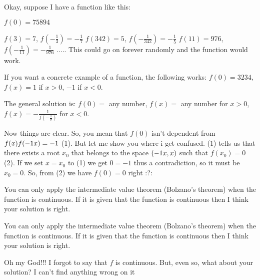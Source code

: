 \begin{solution}
	\begin{tcolorbox}Okay, suppose I have a function like this:

$ f(0) = 75894$

$ f(3) = 7$, $ f( - \frac {1}{3}) = - \frac {1}{7}$
$ f(342) = 5$, $ f( - \frac {1}{342}) = - \frac {1}{5}$
$ f(11) = 976$, $ f( - \frac {1}{11}) = - \frac {1}{976}$
.....
This could go on forever randomly and the function would work.

If you want a concrete example of a function, the following works:
$ f(0) = 3234$, $ f(x) = 1$ if $ x > 0$, $ - 1$ if $ x < 0$.

The general solution is:
$ f(0) =$ any number, $ f(x) =$ any number for $ x > 0$, $ f(x) = - \frac {1}{f( - \frac {1}{x})}$ for $ x < 0$.\end{tcolorbox}


Now things are clear. So, you mean that $ f(0)$ isn't dependent from $ f(x)f(-1\/x)=-1$ (1).
But let me show you where i get confused.
(1) tells us that there exists a root $ x_0$ that belongs to the space $ (-1\/x,x)$ such that $ f(x_0)=0$ (2).
If we set $ x=x_0$ to (1) we get $ 0=-1$ thus a contradiction, so it must be $ x_0=0$. So, from (2) we have $ f(0)=0$ right :?:
\end{solution}



\begin{solution}
	You can only apply the intermediate value theorem (Bolzano's theorem) when the function is continuous. If it is given that the function is continuous then I think your solution is right.
\end{solution}



\begin{solution}
	\begin{tcolorbox}You can only apply the intermediate value theorem (Bolzano's theorem) when the function is continuous. If it is given that the function is continuous then I think your solution is right.\end{tcolorbox}

Oh my God!!! I forgot to say that $ f$ is continuous. But, even so, what about your solution? I can't find anything wrong on it
\end{solution}



